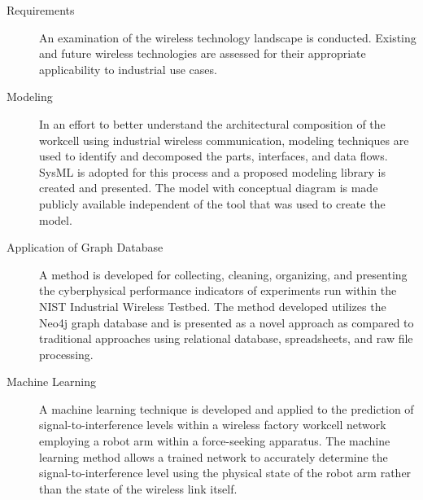 \documentclass[twocolumn]{IEEEtran}
\begin{document}
		\begin{description}
			\item[Requirements] \cite{CandellRW2017, Montgomery2019, Candell2018.IWSGuide} An examination of the wireless technology landscape is conducted.  Existing and future wireless technologies are assessed for their appropriate applicability to industrial use cases. 
			
			\item[Modeling] \cite{Candell2019ASR.SYSML, Candell2018SysML.JRES, Candell2018SysML.GitHub} In an effort to better understand the architectural composition of the workcell using industrial wireless communication, modeling techniques are used to identify and decomposed the parts, interfaces, and data flows.  SysML is adopted for this process and a proposed modeling library is created and presented.  The model with conceptual diagram is made publicly available independent of the tool that was used to create the model.
			
			\item[Application of Graph Database] \cite{CandellISIT2020.Conf} A method is developed for collecting, cleaning, organizing, and presenting the cyberphysical performance indicators of experiments run within the NIST Industrial Wireless Testbed. The method developed utilizes the Neo4j graph database and is presented as a novel approach as compared to traditional approaches using relational database, spreadsheets, and raw file processing.
			
			\item[Machine Learning] \cite{CandellISIE2019.Conf, CandellISIE2019.Conf.Data, CandellIJAMT2020.Jrml} A machine learning technique is developed and applied to the prediction of signal-to-interference levels within a wireless factory workcell network employing a robot arm within a force-seeking apparatus.  The machine learning method allows a trained network to accurately determine the signal-to-interference level using the physical state of the robot arm rather than the state of the wireless link itself.
		\end{description}
	
		
%		
%		
%		
		
\end{document}
